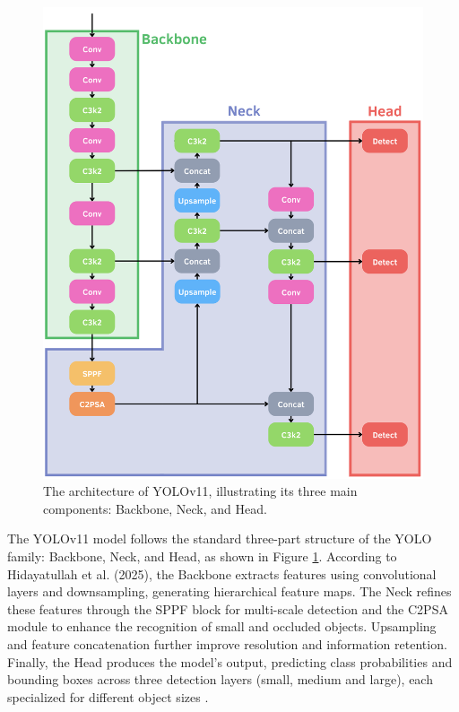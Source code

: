 \documentclass[a4paper,10pt,twocolumn]{article}
\numberwithin{figure}{section}
\numberwithin{table}{section}
\begin{document}
\begin{figure}[h]
    \centering
    \includegraphics[width=1\linewidth]{YOLOARC.png}  %
    \caption{The architecture of YOLOv11, illustrating its three main components: Backbone, Neck, and Head.}
    \label{fig:Arc}  
\end{figure}

The YOLOv11 model follows the standard three-part structure of the YOLO family: 
Backbone, Neck, and Head, as shown in Figure \ref{fig:Arc}.
According to Hidayatullah et al. (2025), the Backbone extracts features using 
convolutional layers and downsampling, generating hierarchical feature maps.
The Neck refines these features through the SPPF block for multi-scale detection 
and the C2PSA module to enhance the recognition of small and occluded objects. 
Upsampling and feature concatenation further improve resolution and information 
retention. Finally, the Head produces the model’s output, predicting class probabilities 
and bounding boxes across three detection layers (small, medium and large), 
each specialized for different object sizes \citep{hidayatullah2025yolov8yolo11comprehensivearchitecture}.
\vspace{0.3cm}
\end{document}
